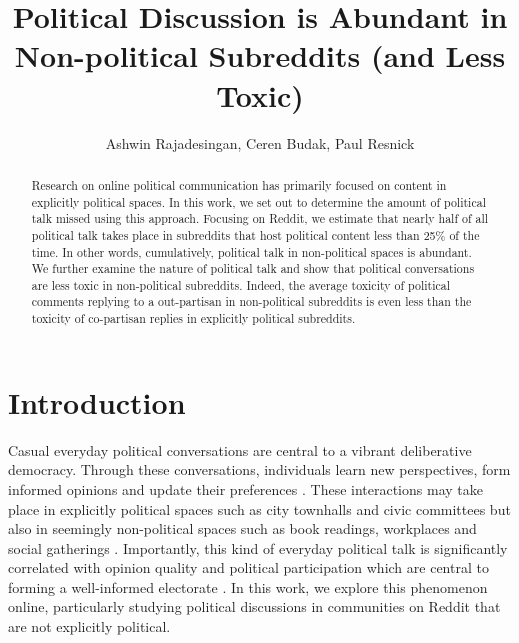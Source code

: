 \documentclass[letterpaper]{article} %
\title{
Political Discussion is Abundant in Non-political Subreddits (and Less Toxic)}
\author{Ashwin Rajadesingan,
Ceren Budak,
Paul Resnick\\}
\begin{document}
\maketitle

\begin{abstract}
Research on online political communication has primarily focused on content in explicitly political spaces. In this work, we set out to determine the amount of political talk missed using this approach. Focusing on Reddit, we estimate that nearly half of all political talk takes place in subreddits that host political content less than 25\% of the time. In other words, cumulatively, political talk in non-political spaces is abundant. We further examine the nature of political talk and show that political conversations are less toxic in non-political subreddits. Indeed, the average toxicity of political comments replying to a out-partisan in non-political subreddits is even less than the toxicity of co-partisan replies in explicitly political subreddits.

\end{abstract}

\section{Introduction}
Casual everyday political conversations are central to a vibrant deliberative democracy. Through these conversations, individuals learn new perspectives, form informed opinions and update their preferences \cite{kim2008theorizing}. These interactions may take place in explicitly political spaces such as city townhalls and civic committees but also in seemingly non-political spaces such as book readings, workplaces and social gatherings \cite{conover2018taking}. Importantly, this kind of everyday political talk is significantly correlated with opinion quality and political participation which are central to forming a well-informed electorate \cite{wyatt2000bridging}. In this work, we explore this phenomenon online, particularly studying political discussions in communities on Reddit that are not explicitly political.
\end{document}

